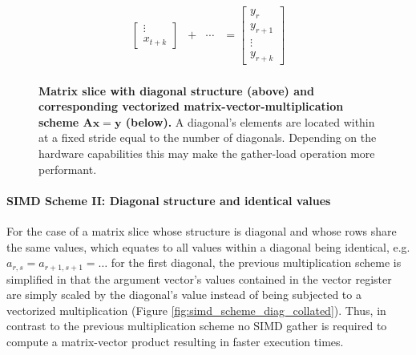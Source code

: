 \documentclass{article}
\begin{document}
\begin{figure}[ht]
$$\begin{matrix}
\begin{bmatrix}
                                                                                \vdots \\
                                                                                x_{t+k}
                                                                              \end{bmatrix} & + & \cdots & = \begin{bmatrix}
                                                                                                                 y_{r} \\
                                                                                                                 y_{r+1} \\
                                                                                                                 \vdots \\
                                                                                                                 y_{r+k}
                                                                                                                \end{bmatrix}\\

        \end{matrix}
        $$
        \caption[Matrix slice with diagonal structure and corresponding vectorized matrix-vector multiplication scheme.]{\textbf{Matrix slice with diagonal structure (above) and corresponding vectorized matrix-vector-multiplication scheme $\bm{Ax = y}$ (below).} A diagonal's elements are located within \V at a fixed stride equal to the number of diagonals. Depending on the hardware capabilities this may make the gather-load operation more performant.}
        \label{fig:simd_scheme_diag}
      \end{figure}

      \paragraph{SIMD Scheme II: Diagonal structure and identical values}

      For the case of a matrix slice whose structure is diagonal and whose rows share the same values, which equates to all values within a diagonal being identical, e.g. $a_{r,s} = a_{r+1, s+1} = \ldots$ for the first diagonal, the previous multiplication scheme is simplified in that the argument vector's values contained in the vector register are simply scaled by the diagonal's value instead of being subjected to a vectorized multiplication (Figure \ref{fig:simd_scheme_diag_collated}). Thus, in contrast to the previous multiplication scheme no SIMD gather is required to compute a matrix-vector product resulting in faster execution times.
\end{document}
